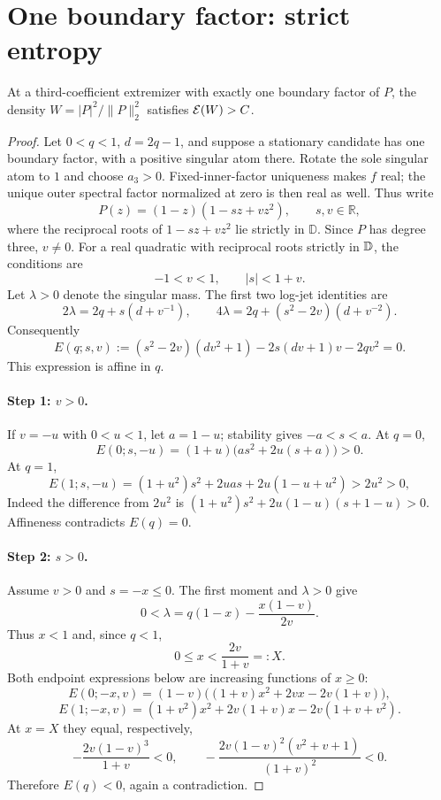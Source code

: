 \section{One boundary factor: strict entropy}
\begin{lemma}\label{lem:one}
At a third-coefficient extremizer with exactly one boundary factor of
$P$, the density $W=|P|^2/\|P\|_2^2$ satisfies $\mathcal E(W)>C$.
\end{lemma}
\begin{proof}
Let $0<q<1$, $d=2q-1$, and suppose a stationary candidate has one boundary factor, with a positive singular atom there. Rotate the sole singular atom to $1$ and choose $a_3>0$.
Fixed-inner-factor uniqueness makes $f$ real; the unique outer spectral
factor normalized at zero is then real as well. Thus write
\[
 P(z)=(1-z)(1-sz+vz^2),\qquad s,v\in\mathbb R,
\]
where the reciprocal roots of $1-sz+vz^2$ lie strictly in $\mathbb D$. Since $P$ has degree three, $v\ne0$. For a real quadratic with reciprocal roots strictly in $\mathbb D$, the
conditions are
\[
 -1<v<1,\qquad |s|<1+v.
\]
Let $\lambda>0$ denote the singular mass. The first two log-jet identities are
\[
 2\lambda=2q+s(d+v^{-1}),\qquad
 4\lambda=2q+(s^2-2v)(d+v^{-2}).
\]
Consequently
\[
 E(q;s,v):=(s^2-2v)(d v^2+1)-2s(dv+1)v-2qv^2=0.
\]
This expression is affine in $q$.

\paragraph{Step 1: $v>0$.}
If $v=-u$ with $0<u<1$, let $a=1-u$; stability gives $-a<s<a$. At $q=0$,
\[
 E(0;s,-u)=(1+u)\bigl(a s^2+2u(s+a)\bigr)>0.
\]
At $q=1$,
\[
 E(1;s,-u)=(1+u^2)s^2+2ua s+2u(1-u+u^2)>2u^2>0,
\]
Indeed the difference from $2u^2$ is
$(1+u^2)s^2+2u(1-u)(s+1-u)>0$. Affineness contradicts $E(q)=0$.

\paragraph{Step 2: $s>0$.}
Assume $v>0$ and $s=-x\le0$. The first moment and $\lambda>0$ give
\[
 0<\lambda=q(1-x)-\frac{x(1-v)}{2v}.
\]
Thus $x<1$ and, since $q<1$,
\[
 0\le x<\frac{2v}{1+v}=:X.
\]
Both endpoint expressions below are increasing functions of $x\ge0$:
\[
 E(0;-x,v)=(1-v)\bigl((1+v)x^2+2vx-2v(1+v)\bigr),
\]
\[
 E(1;-x,v)=(1+v^2)x^2+2v(1+v)x-2v(1+v+v^2).
\]
At $x=X$ they equal, respectively,
\[
 -\frac{2v(1-v)^3}{1+v}<0,
 \qquad
 -\frac{2v(1-v)^2(v^2+v+1)}{(1+v)^2}<0.
\]
Therefore $E(q)<0$, again a contradiction.


\end{proof}
